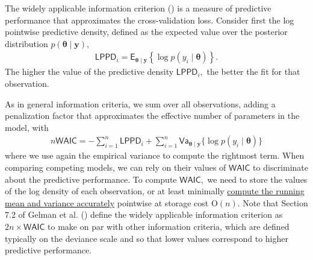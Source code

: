 \documentclass[
  11pt,
  letterpaper,
]{scrbook}
\theoremstyle{definition}
\theoremstyle{plain}
\theoremstyle{plain}
\theoremstyle{plain}
\theoremstyle{definition}
\theoremstyle{definition}
\theoremstyle{plain}
\theoremstyle{plain}
\theoremstyle{remark}
\begin{document}
The widely applicable information criterion
() is a measure of predictive
performance that approximates the cross-validation loss. Consider first
the log pointwise predictive density, defined as the expected value over
the posterior distribution
\(p(\boldsymbol{\theta} \mid \boldsymbol{y}),\) \begin{align*}
\mathsf{LPPD}_i = \mathsf{E}_{\boldsymbol{\theta} \mid \boldsymbol{y}} \left\{ \log p(y_i \mid \boldsymbol{\theta})\right\}.
\end{align*} The higher the value of the predictive density
\(\mathsf{LPPD}_i,\) the better the fit for that observation.

As in general information criteria, we sum over all observations, adding
a penalization factor that approximates the effective number of
parameters in the model, with \begin{align*}
n\mathsf{WAIC} = -\sum_{i=1}^n \mathsf{LPPD}_i + \sum_{i=1}^n \mathsf{Va}_{\boldsymbol{\theta} \mid \boldsymbol{y}}\{\log p(y_i \mid \boldsymbol{\theta})\}
\end{align*} where we use again the empirical variance to compute the
rightmost term. When comparing competing models, we can rely on their
values of \(\mathsf{WAIC}\) to discriminate about the predictive
performance. To compute \(\mathsf{WAIC},\) we need to store the values
of the log density of each observation, or at least minimally
\href{https://www.johndcook.com/blog/standard_deviation/}{compute the
running mean and variance accurately} pointwise at storage cost
\(\mathrm{O}(n).\) Note that Section 7.2 of Gelman et al.
() define the widely applicable
information criterion as \(2n \times \mathsf{WAIC}\) to make on par with
other information criteria, which are defined typically on the deviance
scale and so that lower values correspond to higher predictive
performance.
\end{document}
